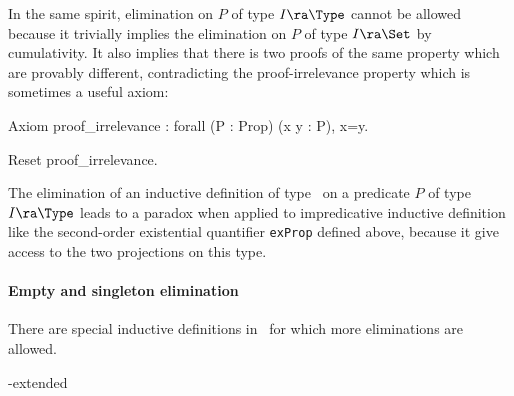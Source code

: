 
In the same spirit, elimination on $P$ of type $I\ra
\Type$ cannot be allowed because it trivially implies the elimination
on $P$ of type $I\ra \Set$ by cumulativity. It also implies that there
is two proofs of the same property which are provably different,
contradicting the proof-irrelevance property which is sometimes a
useful axiom:
\begin{coq_example}
Axiom proof_irrelevance : forall (P : Prop) (x y : P), x=y.
\end{coq_example}
\begin{coq_eval}
Reset proof_irrelevance.
\end{coq_eval}
The elimination of an inductive definition of type \Prop\ on a
predicate $P$ of type $I\ra \Type$ leads to a paradox when applied to 
impredicative inductive definition like the second-order existential
quantifier \texttt{exProp} defined above, because it give access to
the two projections on this type.


\paragraph[Empty and singleton elimination]{Empty and singleton elimination\label{singleton}
}

There are special inductive definitions in \Prop\ for which more
eliminations are allowed. 
\begin{description}
\item[\Prop-extended] 
\end{description}

